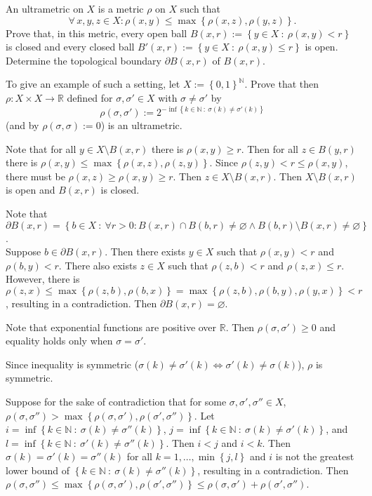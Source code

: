 \documentclass{homework}
\begin{document}
\problem An ultrametric on $X$ is a metric $\rho$ on $X$ such that 
\[
  \forall \, x, y, z \in X: \rho(x, y) \leq
    \max \left \{ \rho(x, z), \rho(y, z) \right \}.
\] 
Prove that, in this metric, every open ball 
  $B(x, r) := \left \{ y \in X ~ : ~ \rho(x, y) < r \right \}$ is closed 
  and every closed ball $B'(x, r) := \left \{ y \in X ~ : ~ 
  \rho(x, y) \leq r \right \}$ is open.
Determine the topological boundary $\partial B(x, r)$ of $B(x, r)$.

To give an example of such a setting, let $X := \left \{ 0, 1 \right \}^
{\mathbb N}$.
Prove that then $\rho : X \times X \to \mathbb R$ defined for 
$\sigma, \sigma' \in X$ with $\sigma \neq \sigma'$ by 
\[
  \rho(\sigma, \sigma') := %
    2^{-\inf\left \{ k \in \mathbb N ~ : ~ \sigma(k) \neq \sigma'(k) \right \}}
\]
(and by $\rho(\sigma, \sigma) := 0$) is an ultrametric.

  \solution Note that for all $y \in X \setminus B(x, r)$ there is 
    $\rho(x, y) \geq r$.
  Then for all $z \in B(y, r)$ there is $\rho(x, y) \leq 
    \max\left \{ \rho(x, z), \rho(z, y) \right \}$.
  Since $\rho(z, y) < r \leq \rho(x, y)$, there must be 
    $\rho(x, z) \geq \rho(x, y) \geq r$.
  Then $z \in X \setminus B(x, r)$.
  Then $X \setminus B(x, r)$ is open and $B(x, r)$ is closed.
    
  Note that $\partial B(x, r) = \left \{ b \in X ~ : ~ 
    \forall r > 0: B(x, r) \cap B(b, r) \neq  \varnothing \wedge 
    B(b, r) \setminus B(x, r) \neq \varnothing \right \}$. \\ 
  Suppose $b \in \partial B(x, r)$.
  Then there exists $y \in X$ such that $\rho(x, y) < r$ and $\rho(b, y) < r$.
  There also exists $z \in X$ such that $\rho(z, b) < r$ and 
    $\rho(z, x) \leq r$.
  However, there is $\rho(z, x) \leq 
    \max\left \{ \rho(z, b), \rho(b, x) \right \} = 
    \max\left \{ \rho(z, b), \rho(b, y), \rho(y, x) \right \} < r$, 
    resulting in a contradiction.
  Then $\partial B(x, r) = \varnothing$.
  
  Note that exponential functions are positive over $\mathbb R$.
  Then $\rho(\sigma, \sigma') \geq 0$ and equality holds only when 
    $\sigma = \sigma'$.

  Since inequality is symmetric ($\sigma(k) \neq \sigma'(k) \Leftrightarrow 
    \sigma'(k) \neq \sigma(k)$), $\rho$ is symmetric.

  Suppose for the sake of contradiction that for some $\sigma, \sigma', 
    \sigma'' \in X$, $\rho(\sigma, \sigma'') > 
    \max\left \{ \rho(\sigma, \sigma'), \rho(\sigma', \sigma'') \right \}$.
  Let $i = \inf\left \{ k \in \mathbb N ~ : ~ \sigma(k) \neq 
    \sigma''(k) \right \}$, $j = \inf\left \{ k \in \mathbb N ~ : ~ 
    \sigma(k) \neq \sigma'(k) \right \}$, and $l = 
    \inf\left \{ k \in \mathbb N ~ : ~ \sigma'(k) \neq \sigma''(k) \right \}$.
  Then $i < j$ and $i < k$.
  Then $\sigma(k) = \sigma'(k) = \sigma''(k)$ for all $k = 1, \dots, 
    \min\left \{ j, l \right \}$ and $i$ is not the greatest lower bound of 
    $\left \{ k \in \mathbb N ~ : ~ \sigma(k) \neq \sigma''(k) \right \}$, 
   resulting in a contradiction.
 Then $\rho(\sigma, \sigma'') \leq \max\left \{ \rho(\sigma, \sigma'), 
  \rho(\sigma', \sigma'') \right \} \leq \rho(\sigma, \sigma') + 
  \rho(\sigma', \sigma'')$.
  
\end{document}
